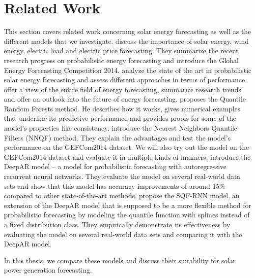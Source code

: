 \section{Related Work}
\label{sec:related-work}

This section covers related work concerning solar energy forecasting as well as 
the different models that we investigate. 
\Textcite{Hong2016} discuss the importance of solar energy, wind energy, electric load 
and electric price forecasting. They summarize the recent research progress on probabilistic 
energy forecasting and introduce the Global Energy Forecasting Competition 2014.
\Textcite{Meer2018} analyze the state of the art in probabilistic solar energy forecasting 
and assess different approaches in terms of performance. 
\Textcite{Hong2020} offer a view of the entire field of energy forecasting, summarize research 
trends and offer an outlook into the future of energy forecasting.
\Textcite{Meinshausen2006} proposes the Quantile Random Forests method. He describes 
how it works, gives numerical examples that underline its predictive performance
and provides proofs for some of the model's properties like consistency. 
\Textcite{Ordiano2019} introduce the Nearest Neighbors Quantile Filters (NNQF) method. 
They explain the advantages and test the model's performance on the GEFCom2014 dataset. 
We will also try out the model on the GEFCom2014 dataset and evaluate 
it in multiple kinds of manners.
\Textcite{Salinas2017} introduce the DeepAR model -- a model for probabilistic forecasting 
with autoregressive recurrent neural networks. They evaluate the model on several 
real-world data sets and show that this model has accuracy improvements of around 
\(15\%\) compared to other state-of-the-art methods.
\Textcite{Gasthaus2019} propose the SQF-RNN model, an extension of the DeepAR model 
that is supposed to be a more flexible method for probabilistic forecasting 
by modeling the quantile function with splines instead of a fixed distribution class.
They empirically demonstrate its effectiveness by evaluating the model on several real-world 
data sets and comparing it with the DeepAR model.

In this thesis, we compare these models and discuss 
their suitability for solar power generation forecasting.